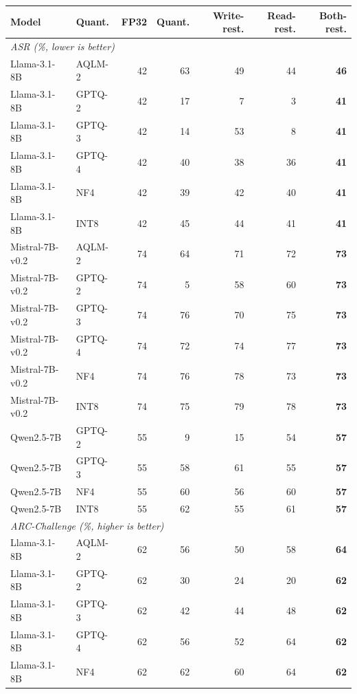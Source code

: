 \documentclass[11pt]{article}
\begin{document}
\begin{center}
\footnotesize
\begin{tabular}{llrrrrr}
\toprule
\textbf{Model} & \textbf{Quant.} & \textbf{FP32} & \textbf{Quant.} & \textbf{Write-rest.} & \textbf{Read-rest.} & \textbf{Both-rest.} \\
\midrule
\multicolumn{7}{l}{\emph{ASR (\%, lower is better)}}\\
Llama-3.1-8B    & AQLM-2  & 42 & 63 & 49 & 44 & \textbf{46} \\
Llama-3.1-8B    & GPTQ-2  & 42 & 17 & 7  & 3  & \textbf{41} \\
Llama-3.1-8B    & GPTQ-3  & 42 & 14 & 53 & 8  & \textbf{41} \\
Llama-3.1-8B    & GPTQ-4  & 42 & 40 & 38 & 36 & \textbf{41} \\
Llama-3.1-8B    & NF4     & 42 & 39 & 42 & 40 & \textbf{41} \\
Llama-3.1-8B    & INT8    & 42 & 45 & 44 & 41 & \textbf{41} \\
Mistral-7B-v0.2 & AQLM-2  & 74 & 64 & 71 & 72 & \textbf{73} \\
Mistral-7B-v0.2 & GPTQ-2  & 74 & 5  & 58 & 60 & \textbf{73} \\
Mistral-7B-v0.2 & GPTQ-3  & 74 & 76 & 70 & 75 & \textbf{73} \\
Mistral-7B-v0.2 & GPTQ-4  & 74 & 72 & 74 & 77 & \textbf{73} \\
Mistral-7B-v0.2 & NF4     & 74 & 76 & 78 & 73 & \textbf{73} \\
Mistral-7B-v0.2 & INT8    & 74 & 75 & 79 & 78 & \textbf{73} \\
Qwen2.5-7B      & GPTQ-2  & 55 & 9  & 15 & 54 & \textbf{57} \\
Qwen2.5-7B      & GPTQ-3  & 55 & 58 & 61 & 55 & \textbf{57} \\
Qwen2.5-7B      & NF4     & 55 & 60 & 56 & 60 & \textbf{57} \\
Qwen2.5-7B      & INT8    & 55 & 62 & 55 & 61 & \textbf{57} \\
\midrule
\multicolumn{7}{l}{\emph{ARC-Challenge (\%, higher is better)}}\\
Llama-3.1-8B    & AQLM-2  & 62 & 56 & 50 & 58 & \textbf{64} \\
Llama-3.1-8B    & GPTQ-2  & 62 & 30 & 24 & 20 & \textbf{62} \\
Llama-3.1-8B    & GPTQ-3  & 62 & 42 & 44 & 48 & \textbf{62} \\
Llama-3.1-8B    & GPTQ-4  & 62 & 56 & 52 & 64 & \textbf{62} \\
Llama-3.1-8B    & NF4     & 62 & 62 & 60 & 64 & \textbf{62} \\

\end{tabular}
\end{center}
\end{document}
